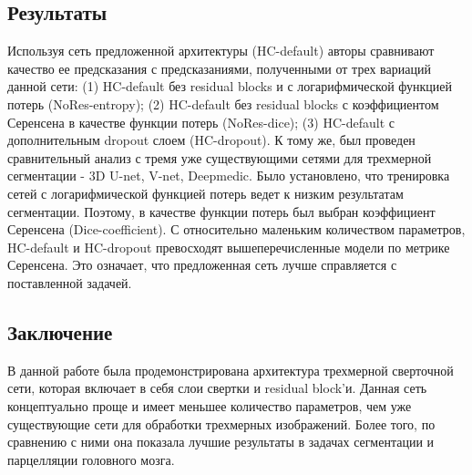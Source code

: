 \subsection*{Результаты}
Используя сеть предложенной архитектуры (HC-default) авторы сравнивают
качество ее предсказания с предсказаниями, полученными от трех вариаций данной сети: 
(1) HC-default без residual blocks и с логарифмической функцией потерь (NoRes-entropy); (2) HC-default без residual blocks с
 коэффициентом Серенсена в качестве функции потерь (NoRes-dice); (3) HC-default с дополнительным dropout слоем (HC-dropout). 
 К тому же, был проведен сравнительный анализ с тремя уже существующими сетями для трехмерной сегментации - 3D U-net, V-net, 
 Deepmedic. Было установлено, что тренировка сетей с логарифмической функцией потерь ведет к низким результатам сегментации.
  Поэтому, в качестве функции потерь был выбран коэффициент Серенсена (Dice-coefficient). С относительно маленьким количеством параметров, 
  HC-default и HC-dropout превосходят вышеперечисленные модели по метрике Серенсена. Это означает, что предложенная сеть лучше справляется с
   поставленной задачей. 
\subsection*{Заключение}
В данной работе была продемонстрирована архитектура трехмерной сверточной сети, 
которая включает в себя слои свертки и residual block'и. Данная сеть концептуально 
проще и имеет меньшее количество параметров, чем уже существующие сети для обработки 
трехмерных изображений. Более того, по сравнению с ними она показала лучшие результаты 
в задачах сегментации и парцелляции головного мозга. 